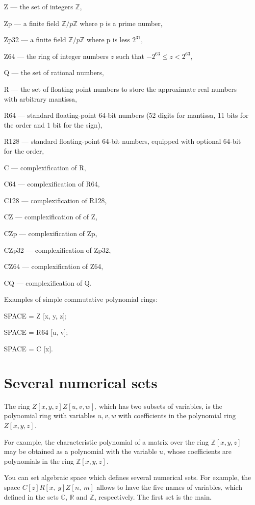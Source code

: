 Z --- the set of integers ${\mathbb Z}$, 

Zp --- a finite field ${\mathbb Z}/p{\mathbb Z}$ where p is a prime number,  

Zp32 --- a finite field ${\mathbb Z}/p{\mathbb Z}$ where p is less $2^{31}$,  

Z64 --- the ring of integer numbers $z$  such that $-2^{63} \leqslant z < 2^{63}$,  

Q ---  the set of rational numbers, 
 
R --- the set of floating point numbers to store the approximate real numbers with arbitrary mantissa,  

R64 ---  standard floating-point 64-bit numbers (52 digits for mantissa, 11 bits for the order and 1 bit for the sign),   
 
R128 --- standard floating-point 64-bit numbers, equipped with optional 64-bit for the order, 

C --- complexification of R,  

C64 --- complexification of R64, 

C128 --- complexification of R128,   

CZ --- complexification of of Z, 
 
CZp --- complexification of Zp, 

CZp32 --- complexification of Zp32,  

CZ64 --- complexification of Z64,   

CQ --- complexification of Q.  

Examples of simple commutative polynomial rings:
 
SPACE = Z [x,  y,  z]; 

SPACE = R64 [u,  v];  

SPACE = C [x]. 
 
\section{Several numerical sets}
The ring $Z[x,y,z]Z[u,v,w]$, which has two subsets of
 variables, is the polynomial ring with variables $u, v, w$ with coefficients in the polynomial ring $Z[x,y,z]$.

For example, the characteristic polynomial
 of a matrix over the ring $\mathbb{Z}[x,y,z]$ may be obtained as a polynomial with the variable $u$, whose coefficients are
polynomials in the ring $\mathbb{Z}[x,y,z]$.

You can set
algebraic space which defines several numerical sets. For example, the space $C [z] R [x, ~ y] Z [n, ~ m]$ allows to have
 the five names of variables, which defined in the sets $\mathbb {C}$, $ \mathbb {R} $ and $\mathbb {Z} $, respectively.
The first set is the main.  

